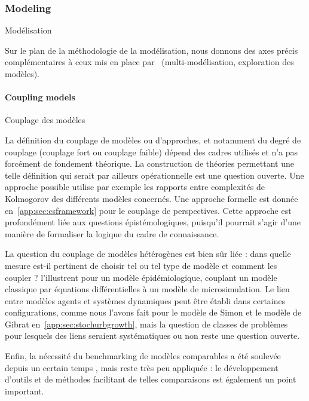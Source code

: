 \subsubsection*{Modeling}{Modélisation}

Sur le plan de la méthodologie de la modélisation, nous donnons des axes précis complémentaires à ceux mis en place par~\cite{pumain2017urban} (multi-modélisation, exploration des modèles).


\paragraph{Coupling models}{Couplage des modèles}


La définition du couplage de modèles ou d'approches, et notamment du degré de couplage (couplage fort ou couplage faible) dépend des cadres utilisés et n'a pas forcément de fondement théorique. La construction de théories permettant une telle définition qui serait par ailleurs opérationnelle est une question ouverte. Une approche possible utilise par exemple les rapports entre complexités de Kolmogorov des différents modèles concernés. Une approche formelle est donnée en~\ref{app:sec:csframework} pour le couplage de perspectives. Cette approche est profondément liée aux questions épistémologiques, puisqu'il pourrait s'agir d'une manière de formaliser la logique du cadre de connaissance.


La question du couplage de modèles hétérogènes est bien sûr liée : dans quelle mesure est-il pertinent de choisir tel ou tel type de modèle et comment les coupler ? \cite{banos2015coupling} l'illustrent pour un modèle épidémiologique, couplant un modèle classique par équations différentielles à un modèle de microsimulation. Le lien entre modèles agents et systèmes dynamiques peut être établi dans certaines configurations, comme nous l'avons fait pour le modèle de Simon et le modèle de Gibrat en~\ref{app:sec:stochurbgrowth}, mais la question de classes de problèmes pour lesquels des liens seraient systématiques ou non reste une question ouverte.


Enfin, la nécessité du benchmarking de modèles comparables a été soulevée depuis un certain temps \cite{axtell1996aligning}, mais reste très peu appliquée : le développement d'outils et de méthodes facilitant de telles comparaisons est également un point important.



